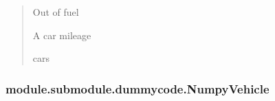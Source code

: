\documentclass[letterpaper,10pt,english]{sphinxmanual}
\begin{document}
\begin{fulllineitems}
\begin{fulllineitems}
\begin{quote}
\begin{description}
\sphinxAtStartPar
{} \textendash{} Out of fuel

\sphinxAtStartPar
A car mileage

\sphinxAtStartPar
cars

\end{description}\end{quote}

\end{fulllineitems}


\end{fulllineitems}


\sphinxstepscope


\subsubsection{module.submodule.dummycode.NumpyVehicle}
\label{\detokenize{_autosummary/module.submodule.dummycode.NumpyVehicle:module-submodule-dummycode-numpyvehicle}}\label{\detokenize{_autosummary/module.submodule.dummycode.NumpyVehicle::doc}}
\end{document}
